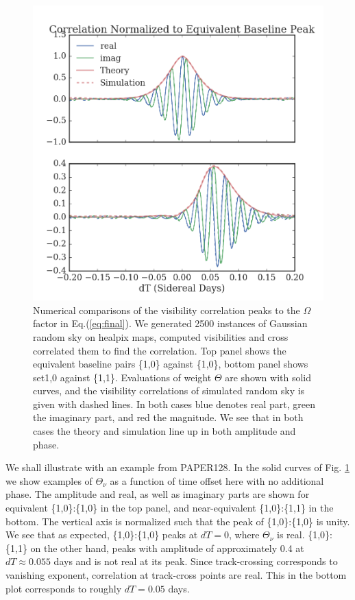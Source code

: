 \documentclass[twocolumn,apj,numberedappendix]{emulateapj}
\renewcommand\[{\begin{equation}}
\renewcommand\]{\end{equation}}
\begin{document}
\begin{figure}[h]
\includegraphics[width=\linewidth]{opp}

\caption{Numerical comparisons of the visibility correlation peaks to the $\Omega$ factor in Eq.(\ref{eq:final}). We generated 2500 instances of Gaussian random sky on healpix maps, computed visibilities and cross correlated them to find the correlation.  Top panel shows the equivalent baseline pairs \{1,0\} against \{1,0\}, bottom panel shows set1,0 against \{1,1\}.  Evaluations of weight $\Theta$ are shown with solid curves, and the visibility correlations of simulated random sky is given with dashed lines. In both cases blue denotes real part, green the imaginary part, and red the magnitude. We see that in both cases the theory and simulation line up in both amplitude and phase.}
\label{fig:numerics}
\end{figure}

We shall illustrate with an example from PAPER128. In the solid curves of Fig. \ref{fig:numerics} we show examples of $\Theta_{\nu}$ as a function of time offset  here with no additional phase. The amplitude and real, as well as imaginary parts are shown for equivalent \{1,0\}:\{1,0\} in the top panel, and near-equivalent \{1,0\}:\{1,1\} in the bottom. The vertical axis is normalized such that the peak of \{1,0\}:\{1,0\} is unity. We see that as expected, \{1,0\}:\{1,0\} peaks at $dT=0$, where $\Theta_{\nu}$ is real. \{1,0\}:\{1,1\} on the other hand, peaks with amplitude of approximately 0.4 at $dT\approx0.055$ days and is not real at its peak. Since track-crossing corresponds to vanishing exponent, correlation at track-cross points are real. This in the bottom plot corresponds to roughly $dT=0.05$ days. 
\end{document}
